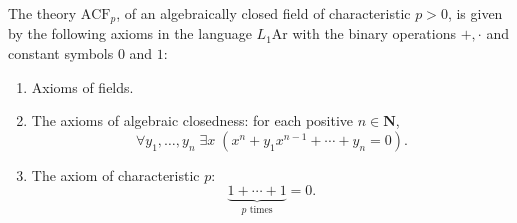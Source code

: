 The theory $\text{ACF}_p$, of an algebraically closed field of characteristic $p > 0$, is given by the following axioms in the language $L_1\text{Ar}$ with the binary operations $+, \cdot$ and constant symbols $0$ and $1$:

\begin{enumerate}
\item[I.] Axioms of fields.
\item[II.] The axioms of algebraic closedness: for each positive $n \in \mathbf{N}$,
$$\forall y_1, \ldots, y_n \; \exists x \; (x^n + y_1 x^{n-1} + \cdots + y_n = 0).$$
\item[III.] The axiom of characteristic $p$:
$$\underbrace{1 + \cdots + 1}_{p \text{ times}} = 0.$$
\end{enumerate}
